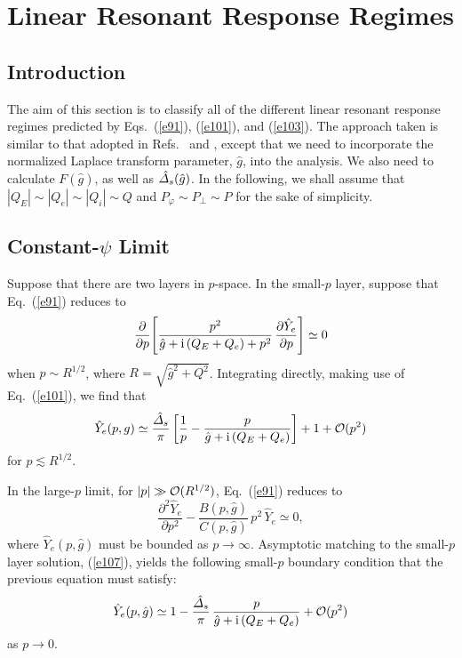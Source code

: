 \documentclass[12pt,prb,aps]{revtex4-1}
\begin{document}
\section{Linear Resonant Response Regimes}\label{response}
\subsection{Introduction}
The aim of this section is to classify all of the different linear resonant response regimes predicted by Eqs.~(\ref{e91}), (\ref{e101}),  and (\ref{e103}). The approach taken is similar to that adopted in Refs.~ and ,
except that we need to incorporate the normalized Laplace transform parameter, $\hat{g}$, into the analysis. We also need to calculate $F(\hat{g})$, as
well as $\hat{\mit\Delta}_s(\hat{g})$. 
In the following, we shall
assume that $|Q_E|\sim |Q_e|\sim |Q_i| \sim Q$ and $P_\varphi\sim P_\perp\sim P$ for the sake of simplicity. 

\subsection{Constant-$\psi$ Limit}\label{scpl}
Suppose that there are two layers in $p$-space. In the small-$p$ layer, suppose that Eq.~(\ref{e91}) reduces to
\begin{equation}
\frac{\partial}{\partial p}\!\left[\frac{p^2}{\hat{g}+{\rm i}\,(Q_E+Q_e)+p^2}\,\frac{\partial\hat{Y}_e}{\partial p}\right]\simeq 0
\end{equation}
when $p \sim R^{1/2}$, where $R= \sqrt{\hat{g}^2+ Q^2}$. 
 Integrating directly, making use of Eq.~(\ref{e101}), we find that
\begin{equation}\label{e107}
\hat{Y}_e(p,g)\simeq \frac{\hat{\mit\Delta}_s}{\pi}\left[\frac{1}{p} - \frac{p}{\hat{g}+{\rm i}\,(Q_E+Q_e)}\right] + 1 + {\cal O}(p^2)
\end{equation}
for $p \lesssim R^{1/2}$.

In the large-$p$ limit, for $|p|\gg {\cal O}(R^{1/2})$,  Eq.~(\ref{e91}) reduces to 
\begin{equation}\label{e329}
\frac{\partial^2\hat{Y}_e}{\partial p^2}- \frac{B(p,\hat{g})}{C(p,\hat{g})}\,p^2\,\hat{Y}_e\simeq 0,
\end{equation}
where  $\hat{Y}_e(p,\hat{g})$ must be bounded as $p\rightarrow\infty$. Asymptotic matching to the small-$p$
layer solution, (\ref{e107}), yields the following small-$p$ boundary condition  that the previous equation must satisfy:
\begin{equation}\label{e330}
\hat{Y}_e(p,\hat{g})\simeq 1-\frac{\hat{\mit\Delta}_s}{\pi}\,\frac{p}{\hat{g}+{\rm i}\,(Q_E+Q_e)} + {\cal O}(p^2)
\end{equation}
as $p\rightarrow 0$. 
\end{document}
